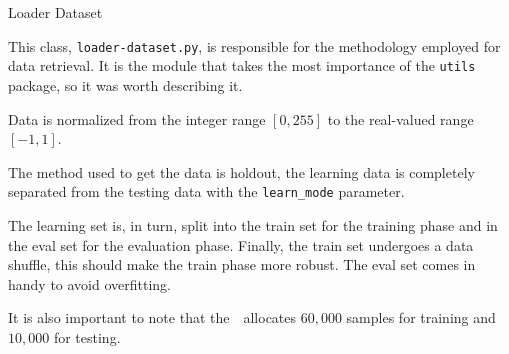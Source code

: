 \begin{subsection}{Loader Dataset}
    \label{subsubsec:loader-dataset}
    \par This class, \texttt{loader-dataset.py}, is responsible for the methodology employed for data retrieval. It is the module that takes the most importance of the \texttt{utils} package, so it was worth describing it.
    \par Data is normalized from the integer range $[0, 255]$ to the real-valued range $[-1, 1]$.
    
    \par The method used to get the data is holdout, the learning data is completely separated from the testing data with the \texttt{learn\_mode} parameter.
    \par The learning set is, in turn, split into the train set for the training phase and in the eval set for the evaluation phase. Finally, the train set undergoes a data shuffle, this should make the train phase more robust. The eval set comes in handy to avoid overfitting.\\
    \par It is also important to note that the~~allocates $60,000$ samples for training and $10,000$ for testing.
\end{subsection}